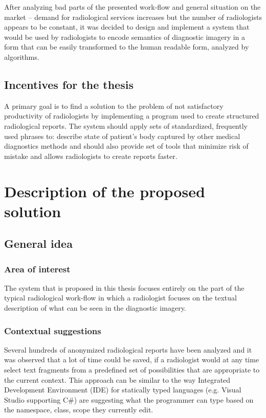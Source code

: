 \documentclass[12pt, twoside, openany]{report}
\theoremstyle{definition}
\begin{document}
After analyzing bad parts of the presented work-flow and general situation on the market -- demand for radiological services increases but the number of radiologists appears to be constant, it was decided to design and implement a system that would be used by radiologists to encode semantics of diagnostic imagery in a form that can be easily transformed to the human readable form, analyzed by algorithms. 

\section{Incentives for the thesis}
A primary goal is to find a solution to the problem of not satisfactory productivity of radiologists by implementing a program used to create structured radiological reports. The system should apply sets of standardized, frequently used phrases to: describe state of patient's body captured by other medical diagnostics methods and should also provide set of tools that minimize risk of mistake and allows radiologists to create reports faster. 



\chapter{Description of the proposed solution}
\section{General idea}
\subsection{Area of interest}
The system that is proposed in this thesis focuses entirely on the part of the typical radiological work-flow in which a radiologist focuses on the textual description of what can be seen in the diagnostic imagery.
\subsection{Contextual suggestions}
Several hundreds of anonymized radiological reports have been analyzed and it was observed that a lot of time could be saved, if a radiologist would at any time select text fragments from a predefined set of possibilities that are appropriate to the current context. This approach can be similar to the way Integrated Development Environment (IDE) for statically typed languages (e.g. Visual Studio supporting C\#) are suggesting what the programmer can type based on the namespace, class, scope they currently edit.
\end{document}
